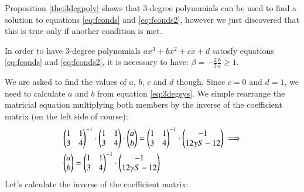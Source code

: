 Proposition \ref{the:3degpoly} shows that 3-degree polynomials can be used
to find a solution to equations \ref{eq:fconds} and \ref{eq:fconds2}, however we
just discovered that this is true only if another condition is met.
\begin{proposition}
\label{prop:3degpolyaccept}
In order to have 3-degree polynomials $ax^3 + bx^2 + cx + d$ satosfy
equations \ref{eq:fconds} and \ref{eq:fconds2}, it is necessary to have:
$\beta = -\frac{2}{3}\frac{b}{a} \geq 1$.
\end{proposition}
We are asked to find the values of $a$, $b$, $c$ and $d$ though. Since $c=0$ and
$d=1$, we need to calculate $a$ and $b$ from equation \ref{eq:3degsys}.
We simple rearrange the matricial equation multiplying both members by the
inverse of the coefficient matrix (on the left side of course):
\begin{align*}
&
\begin{pmatrix}
1 & 1 \\
3 & 4
\end{pmatrix}^{-1}
\cdot
\begin{pmatrix}
1 & 1 \\
3 & 4
\end{pmatrix}
\cdot
\begin{pmatrix}
a \\
b
\end{pmatrix}
=
\begin{pmatrix}
1 & 1 \\
3 & 4
\end{pmatrix}^{-1}
\cdot
\begin{pmatrix}
-1 \\
12 \gamma S - 12
\end{pmatrix}
\implies \notag\\
&\begin{pmatrix}
a \\
b
\end{pmatrix}
=
\begin{pmatrix}
1 & 1 \\
3 & 4
\end{pmatrix}^{-1}
\cdot
\begin{pmatrix}
-1 \\
12 \gamma S - 12
\end{pmatrix}
\end{align*}
Let's calculate the inverse of the coefficient matrix:
